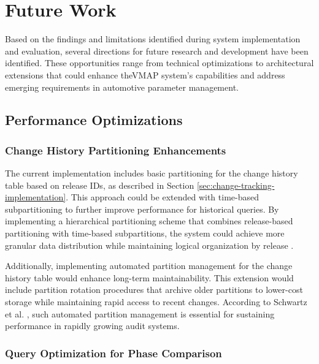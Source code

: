 \section{Future Work}
\label{sec:future-work}

Based on the findings and limitations identified during system implementation and evaluation, several directions for future research and development have been identified. These opportunities range from technical optimizations to architectural extensions that could enhance the\ac{VMAP} system's capabilities and address emerging requirements in automotive parameter management.

\subsection{Performance Optimizations}
\label{subsec:performance-optimizations}

\subsubsection{Change History Partitioning Enhancements}
\label{subsubsec:change-history-partitioning}

The current implementation includes basic partitioning for the change history table based on release IDs, as described in Section \ref{sec:change-tracking-implementation}. This approach could be extended with time-based subpartitioning to further improve performance for historical queries. By implementing a hierarchical partitioning scheme that combines release-based partitioning with time-based subpartitions, the system could achieve more granular data distribution while maintaining logical organization by release \cite{obe2017postgresql}.

Additionally, implementing automated partition management for the change history table would enhance long-term maintainability. This extension would include partition rotation procedures that archive older partitions to lower-cost storage while maintaining rapid access to recent changes. According to Schwartz et al. \cite{schwartz2012high}, such automated partition management is essential for sustaining performance in rapidly growing audit systems.

\subsubsection{Query Optimization for Phase Comparison}
\label{subsubsec:query-optimization}

